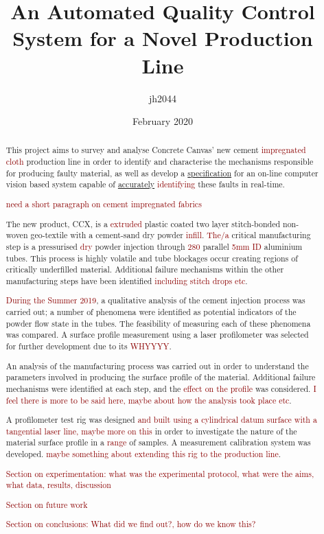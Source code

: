 \documentclass[12pt]{report}
\title{An Automated Quality Control System for a Novel Production Line}
\author{jh2044}
\date{February 2020}
\newcommand{\tcr}[1]{\textcolor{darkRed}{#1}}
\begin{document}
\maketitle

\begin{abstract}
    This project aims to survey and analyse Concrete Canvas' new cement \tcr{impregnated cloth} production line in order to identify and characterise the mechanisms responsible for producing faulty material, as well as develop a \underline{specification} for an on-line computer vision based system capable of \underline{accurately} \tcr{identifying} these faults in real-time.
    
    \tcr{need a short paragraph on cement impregnated fabrics}
    
    The new product, CCX, is a \tcr{extruded} plastic  coated two layer stitch-bonded non-woven geo-textile with a cement-sand dry powder \tcr{infill}. \tcr{The/a} critical manufacturing step is a pressurised \tcr{dry} powder injection  through \tcr{280} parallel \tcr{5mm ID} aluminium tubes. This process is highly volatile and tube blockages occur creating regions of critically underfilled material. Additional failure mechanisms within the other manufacturing steps have been identified \tcr{including stitch drops etc}.
    
    \tcr{During the Summer 2019}, a qualitative analysis of the cement injection process was carried out; a number of phenomena were identified as potential indicators of the powder flow state in the tubes. The feasibility of measuring each of these phenomena was compared. A surface profile measurement using a laser profilometer was selected for further development due to its \tcr{WHYYYY}.
    
    An analysis of the manufacturing process was carried out in order to understand the parameters involved in producing the surface profile of the material. Additional failure mechanisms were identified at each step, and the \tcr{effect on the profile} was considered. \tcr{I feel there is more to be said here, maybe about how the analysis took place etc}.
    
    A profilometer test rig was designed \tcr{and built} \tcr{using a cylindrical datum surface with a tangential laser line, maybe more on this} in order to investigate the nature of the material surface profile in a \tcr{range} of samples. A measurement calibration system was developed. \tcr{maybe something about extending this rig to the production line}.
    
    \tcr{Section on experimentation: what was the experimental protocol, what were the aims, what data, results, discussion}
    
    \tcr{Section on future work}
    
    \tcr{Section on conclusions: What did we find out?, how do we know this?}
    
    
\end{abstract}
\end{document}
